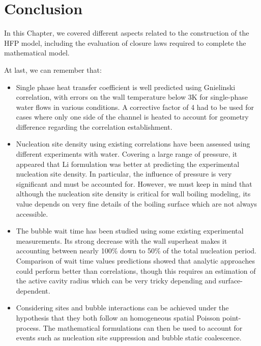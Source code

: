 \section{Conclusion}

In this Chapter, we covered different aspects related to the construction of the HFP model, including the evaluation of closure laws required to complete the mathematical model.

\npar

At last, we can remember that:

\begin{itemize}
\item Single phase heat transfer coefficient is well predicted using Gnielinski correlation, with errors on the wall temperature below 3K for single-phase water flows in various conditions. A corrective factor of 4 had to be used for cases where only one side of the channel is heated to account for geometry difference regarding the correlation establishment.

\item Nucleation site density using existing correlations have been assessed using different experiments with water. Covering a large range of pressure, it appeared that Li \etal \cite{li_development_2018} formulation was better at predicting the experimental nucleation site density. In particular, the influence of pressure is very significant and must be accounted for. However, we must keep in mind that although the nucleation site density is critical for wall boiling modeling, its value depends on very fine details of the boiling surface which are not always accessible.

\item The bubble wait time has been studied using some existing experimental measurements. Its strong decrease with the wall superheat makes it accounting between nearly 100\% down to 50\% of the total nucleation period. Comparison of wait time values predictions showed that analytic approaches could perform better than correlations, though this requires an estimation of the active cavity radius which can be very tricky depending and surface-dependent.

\item Considering sites and bubble interactions can be achieved under the hypothesis that they both follow an homogeneous spatial Poisson point-process. The mathematical formulations can then be used to account for events such as nucleation site suppression and bubble static coalescence.


\end{itemize}
